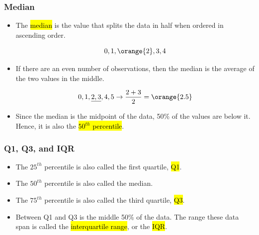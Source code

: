 \begin{frame}
\frametitle{Median}

\begin{itemize}

\item The \hl{median} is the value that splits the data in half when ordered in ascending order.

\[ 0,1,\orange{2},3,4 \]

\item If there are an even number of observations, then the median is the average of the two values in the middle.

\[ 0,1,\underline{2,3},4,5 \rightarrow \frac{2 + 3}{2} = \orange{2.5} \]

\item Since the median is the midpoint of the data, 50\% of the values are below it. Hence, it is also the \hl{$50^{th}$ percentile}.

\end{itemize}

\end{frame}


\begin{frame}[fragile]
\frametitle{Q1, Q3, and IQR}

\begin{itemize}

\item The $25^{th}$ percentile is also called the first quartile, \hl{Q1}.

\item The $50^{th}$ percentile is also called the median.

\item The $75^{th}$ percentile is also called the third quartile, \hl{Q3}.

\item Between Q1 and Q3 is the middle 50\% of the data. The range these data span is called the \hl{interquartile range}, or the \hl{IQR}.
\formula{\[ IQR = Q3 - Q1 \]}
\end{itemize}

\end{frame}


